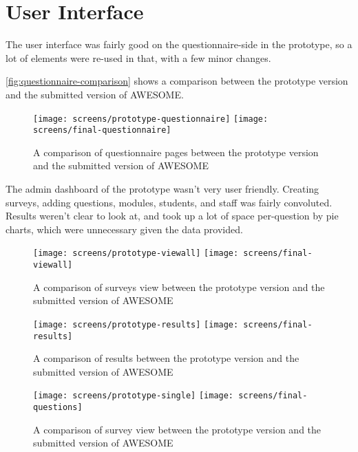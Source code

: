 	\section{User Interface}
	
	The user interface was fairly good on the questionnaire-side in the prototype, so a lot of elements were re-used in that, with a few minor changes.
	
	\autoref{fig:questionnaire-comparison} shows a comparison between the prototype version and the submitted version of \ac{AWESOME}.
	
	\begin{figure}[H]
		\texttt{[image: screens/prototype-questionnaire]}
		\texttt{[image: screens/final-questionnaire]}
		\caption{A comparison of questionnaire pages between the prototype version and the submitted version of \acs{AWESOME}}
		\label{fig:questionnaire-comparison}
	\end{figure}
	
	The admin dashboard of the prototype wasn't very user friendly.
	Creating surveys, adding questions, modules, students, and staff was fairly convoluted.
	Results weren't clear to look at, and took up a lot of space per-question by pie charts, which were unnecessary given the data provided.
	
	\begin{figure}[H]
		\texttt{[image: screens/prototype-viewall]}
		\texttt{[image: screens/final-viewall]}
		\caption{A comparison of surveys view between the prototype version and the submitted version of \acs{AWESOME}}
		\label{fig:surveys-comparison}
	\end{figure}
	
	\begin{figure}[H]
		\texttt{[image: screens/prototype-results]}
		\texttt{[image: screens/final-results]}
		\caption{A comparison of results between the prototype version and the submitted version of \acs{AWESOME}}
		\label{fig:results-comparison}
	\end{figure}
	
	\begin{figure}[H]
		\texttt{[image: screens/prototype-single]}
		\texttt{[image: screens/final-questions]}
		\caption{A comparison of survey view between the prototype version and the submitted version of \acs{AWESOME}}
		\label{fig:view-comparison}
	\end{figure}
	
